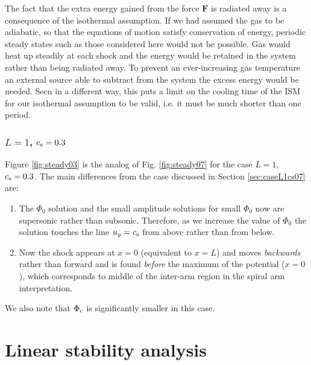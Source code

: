\documentclass[useAMS,usenatbib]{mn2e}
\begin{document}
The fact that the extra energy gained from the force $\mathbf{F}$ is radiated away is a consequence of the isothermal assumption. If we had assumed the gas to be adiabatic, so that the equations of motion satisfy conservation of energy, periodic steady states such as those considered here would not be possible. Gas would heat up steadily at each shock and the energy would be retained in the system rather than being radiated away. To prevent an ever-increasing gas temperature an external source able to subtract from the system the excess energy would be needed. Seen in a different way, this puts a limit on the cooling time of the ISM for our isothermal assumption to be valid, i.e. it must be much shorter than one period.

\subsubsection{$L=1$, $c_{\rm s}=0.3$}

Figure \ref{fig:steady03} is the analog of Fig. \ref{fig:steady07} for the case $L=1$, $c_{\rm s}=0.3$. The main differences from the case discussed in Section \ref{sec:caseL1cs07} are: 
\begin{enumerate} 
\item The $\Phi_0$ solution and the small amplitude solutions for small $\Phi_0$ now are supersonic rather than subsonic. Therefore, as we increase the value of $\Phi_0$ the solution touches the line $u_y=c_{\rm s}$ from above rather than from below.
\item Now the shock appears at $x=0$ (equivalent to $x=L$) and moves \emph{backwards} rather than forward and is found \emph{before} the maximum of the potential ($x=0$), which corresponds to middle of the inter-arm region in the spiral arm interpretation.
\end{enumerate}
We also note that $\Phi_{\rm c}$ is significantly smaller in this case.


\section{Linear stability analysis} \label{sec:linear}
\end{document}
